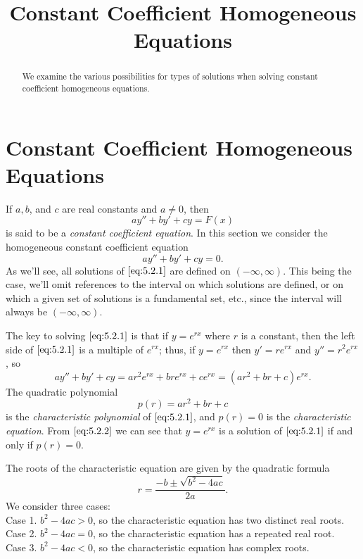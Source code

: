 \documentclass{ximera}
\title{Constant Coefficient Homogeneous Equations}
\begin{document}
 
\begin{abstract}
We examine the various possibilities for types of solutions when solving constant coefficient homogeneous equations.
\end{abstract}
 
\maketitle
 
\section*{Constant Coefficient Homogeneous Equations}
 
If $a,b$, and $c$ are real constants and $a\neq 0$, then
$$
ay''+by'+cy=F(x)
$$
 is said to be a \textit{constant coefficient
 equation}.
In this section we  consider the homogeneous constant
coefficient equation
\begin{equation} \label{eq:5.2.1}
ay''+by'+cy=0.
\end{equation}
As we'll see, all solutions of $\eqref{eq:5.2.1}$ are defined on
$(-\infty,\infty)$.  This being the case, we'll omit references to the
interval on which solutions are defined, or on which a given set of
solutions is a fundamental set, etc., since the interval will always
be $(-\infty,\infty)$.
 
The key to solving $\eqref{eq:5.2.1}$ is that if
 $y=e^{rx}$ where $r$ is a constant, then the left side of
$\eqref{eq:5.2.1}$ is a multiple of $e^{rx}$;   thus, if $y=e^{rx}$
 then $y'=re^{rx}$ and $y''=r^2e^{rx}$, so
\begin{equation} \label{eq:5.2.2}
ay''+by'+cy=ar^2e^{rx}+bre^{rx}+ce^{rx}=(ar^2+br+c)e^{rx}.
\end{equation}
The quadratic polynomial
$$
p(r)=ar^2+br+c
$$
is the \textit{characteristic polynomial} of $\eqref{eq:5.2.1}$, and
$p(r)=0$
is the \textit{characteristic equation}.
From $\eqref{eq:5.2.2}$ we can see that $y=e^{rx}$ is a solution of
$\eqref{eq:5.2.1}$ if and only if $p(r)=0$.
 
The roots of the characteristic equation are given by the quadratic
formula
\begin{equation} \label{eq:5.2.3}
r=\frac{-b\pm\sqrt{b^2-4ac}}{2a}.
\end{equation}
We consider three cases:\\
Case 1. $b^2-4ac>0$, so the characteristic equation has two
distinct real roots.\\
Case 2. $b^2-4ac=0$, so the characteristic equation has a
repeated real root.\\
Case 3. $b^2-4ac<0$, so the characteristic equation has
complex roots.
 
\end{document}
